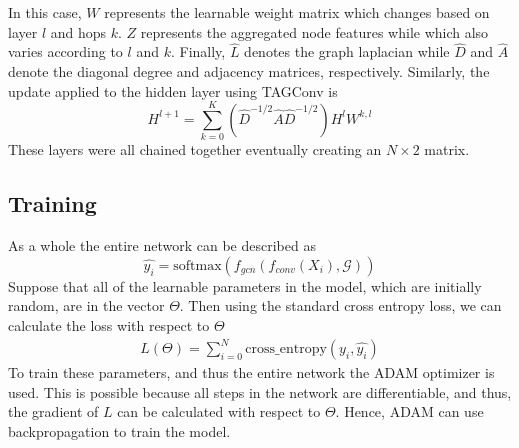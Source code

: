 In this case, $W$ represents the learnable weight matrix which changes based on layer $l$ and hops $k$. $Z$ represents the aggregated node features while which also varies according to $l$ and $k$. Finally, $\hat{L}$ denotes the graph laplacian while $\hat{D}$ and $\hat{A}$ denote the diagonal degree and adjacency matrices, respectively. Similarly, the update applied to the hidden layer using TAGConv is
\[
    H^{l+1} = \sum_{k=0}^K (\hat{D}^{-1/2}\hat{A}\hat{D}^{-1/2})H^lW^{k,l}
\]
These layers were all chained together eventually creating an $N \times 2$ matrix.

\subsection{Training}
As a whole the entire network can be described as
\[
    \hat{y_i} = \text{softmax}(f_{gcn}(f_{conv}(X_i), \mathcal{G}))
\]
Suppose that all of the learnable parameters in the model, which are initially random, are in the vector $\Theta$. Then using the standard cross entropy loss, we can calculate the loss with respect to $\Theta$
\begin{align*}
    L(\Theta) = \sum_{i=0}^N \text{cross\_entropy}(y_i, \hat{y_i})
\end{align*}
To train these parameters, and thus the entire network the ADAM optimizer is used. This is possible because all steps in the network are differentiable, and thus, the gradient of $L$ can be calculated with respect to $\Theta$. Hence, ADAM can use backpropagation to train the model.